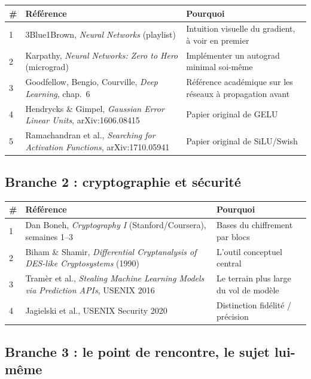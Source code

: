 \documentclass[11pt]{article}
\begin{document}
\begin{table}[h]
\centering
\small
\begin{tabular}{p{0.5cm}p{7.5cm}p{6.5cm}}
\toprule
\# & Référence & Pourquoi \\
\midrule
1 & 3Blue1Brown, \emph{Neural Networks} (playlist) & Intuition visuelle du gradient, à voir en premier \\
2 & Karpathy, \emph{Neural Networks: Zero to Hero} (micrograd) & Implémenter un autograd minimal soi-même \\
3 & Goodfellow, Bengio, Courville, \emph{Deep Learning}, chap.~6 & Référence académique sur les réseaux à propagation avant \\
4 & Hendrycks \& Gimpel, \emph{Gaussian Error Linear Units}, arXiv:1606.08415 & Papier original de GELU \\
5 & Ramachandran et al., \emph{Searching for Activation Functions}, arXiv:1710.05941 & Papier original de SiLU/Swish \\
\bottomrule
\end{tabular}
\end{table}

\subsection{Branche 2 : cryptographie et sécurité}

\begin{table}[h]
\centering
\small
\begin{tabular}{p{0.5cm}p{7.5cm}p{6.5cm}}
\toprule
\# & Référence & Pourquoi \\
\midrule
1 & Dan Boneh, \emph{Cryptography I} (Stanford/Coursera), semaines 1--3 & Bases du chiffrement par blocs \\
2 & Biham \& Shamir, \emph{Differential Cryptanalysis of DES-like Cryptosystems} (1990) & L'outil conceptuel central \\
3 & Tramèr et al., \emph{Stealing Machine Learning Models via Prediction APIs}, USENIX 2016 & Le terrain plus large du vol de modèle \\
4 & Jagielski et al., USENIX Security 2020 & Distinction fidélité / précision \\
\bottomrule
\end{tabular}
\end{table}

\subsection{Branche 3 : le point de rencontre, le sujet lui-même}
\end{document}
